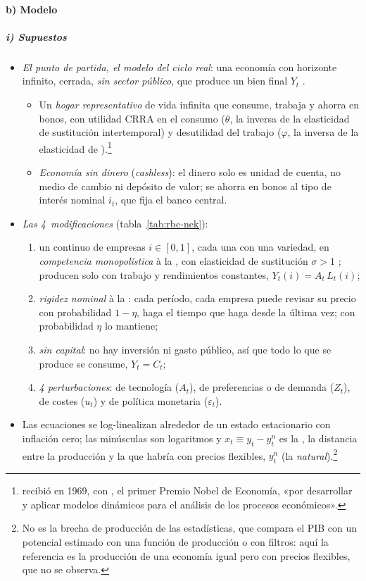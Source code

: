 \documentclass[11pt]{article}
\begin{document}
\paragraph{b) Modelo}

\subparagraph{i) Supuestos}

\begin{itemize}
\item \emph{El punto de partida, el modelo del ciclo real}: una economía con horizonte infinito, cerrada, \emph{sin sector público}, que produce un bien final $Y_t$ .
  \begin{itemize}
  \item Un \emph{hogar representativo} de vida infinita que consume, trabaja y ahorra en bonos, con utilidad CRRA en el consumo ($\theta$, la inversa de la elasticidad de sustitución intertemporal) y desutilidad del trabajo ($\varphi$, la inversa de la elasticidad de ).\footnote{ recibió en 1969, con , el primer Premio Nobel de Economía, «por desarrollar y aplicar modelos dinámicos para el análisis de los procesos económicos»\nocite{Nobel1969}.}
  \item \emph{Economía sin dinero} (\emph{cashless}): el dinero solo es unidad de cuenta, no medio de cambio ni depósito de valor; se ahorra en bonos al tipo de interés nominal $i_t$, que fija el banco central.
  \end{itemize}
\item \emph{Las 4~modificaciones} (tabla~\ref{tab:rbc-nek}):
  \begin{enumerate}
  \item un continuo de empresas $i\in[0,1]$, cada una con una variedad, en \emph{competencia monopolística} à la \textcite{DixitStiglitz1977Monopolistic}, con elasticidad de sustitución $\sigma>1$ ; producen solo con trabajo y rendimientos constantes, $Y_t(i)=A_t\,L_t(i)$;
  \item \emph{rigidez nominal} à la \textcite{Calvo1983Staggered}: cada período, cada empresa puede revisar su precio con probabilidad $1-\eta$, haga el tiempo que haga desde la última vez; con probabilidad $\eta$ lo mantiene;
  \item \emph{sin capital}: no hay inversión ni gasto público, así que todo lo que se produce se consume, $Y_t=C_t$;
  \item \emph{4 perturbaciones}: de tecnología ($A_t$), de preferencias o de demanda ($Z_t$), de costes ($u_t$) y de política monetaria ($\varepsilon_t$).
  \end{enumerate}
\item Las ecuaciones se log-linealizan alrededor de un estado estacionario con inflación cero; las minúsculas son logaritmos y $x_t\equiv y_t-y^n_t$ es la , la distancia entre la producción y la que habría con precios flexibles, $y^n_t$ (la \emph{natural}).\footnote{No es la brecha de producción de las estadísticas, que compara el PIB con un potencial estimado con una función de producción o con filtros\nocite{GuisingerOwyangShell2018}: aquí la referencia es la producción de una economía igual pero con precios flexibles, que no se observa.}
\end{itemize}
\end{document}
